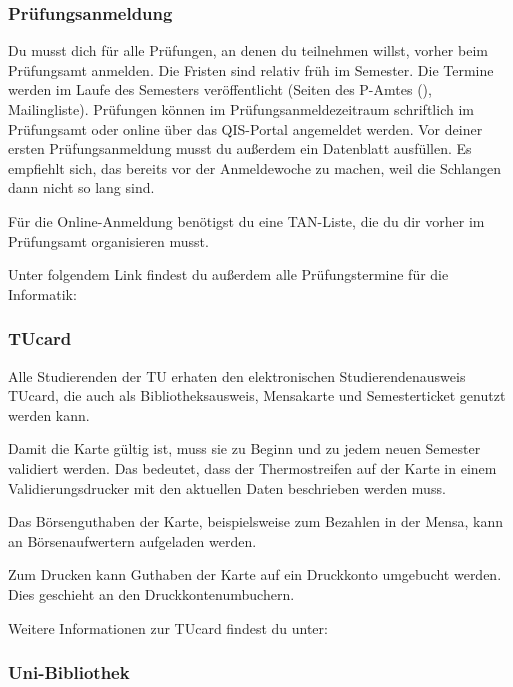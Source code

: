 \begin{multicols}{2}
\subsubsection{Prüfungsanmeldung}
	\label{todoanmeldung}

	Du musst dich für alle Prüfungen, an denen du teilnehmen willst, vorher beim Prüfungsamt anmelden. Die Fristen sind relativ früh im Semester. Die Termine werden im Laufe des Semesters veröffentlicht (Seiten des P-Amtes (), Mailingliste). Prüfungen können im Prüfungsanmeldezeitraum schriftlich im Prüfungsamt oder online über das QIS-Portal angemeldet werden.
	Vor deiner ersten Prüfungsanmeldung musst du außerdem ein Datenblatt ausfüllen. Es empfiehlt sich, das bereits vor der Anmeldewoche zu machen, weil die Schlangen dann nicht so lang sind.

	Für die Online-Anmeldung benötigst du eine TAN-Liste, die du dir vorher im Prüfungsamt organisieren musst.

	Unter folgendem Link findest du außerdem alle Prüfungstermine für die Informatik:

\subsubsection{TUcard}
	\label{tucard}
	
	Alle Studierenden der TU erhaten den elektronischen Studierendenausweis TUcard, die auch als Bibliotheksausweis, Mensakarte und Semesterticket genutzt werden kann.

	Damit die Karte gültig ist, muss sie zu Beginn und zu jedem neuen Semester validiert werden. Das bedeutet, dass der Thermostreifen auf der Karte in einem Validierungsdrucker mit den aktuellen Daten beschrieben werden muss.

	Das Börsenguthaben der Karte, beispielsweise zum Bezahlen in der Mensa, kann an Börsenaufwertern aufgeladen werden.

	Zum Drucken kann Guthaben der Karte auf ein Druckkonto umgebucht werden. Dies geschieht an den Druckkontenumbuchern.

	Weitere Informationen zur TUcard findest du unter: 

\subsubsection{Uni-Bibliothek}
	\label{todobib}


\end{multicols}
